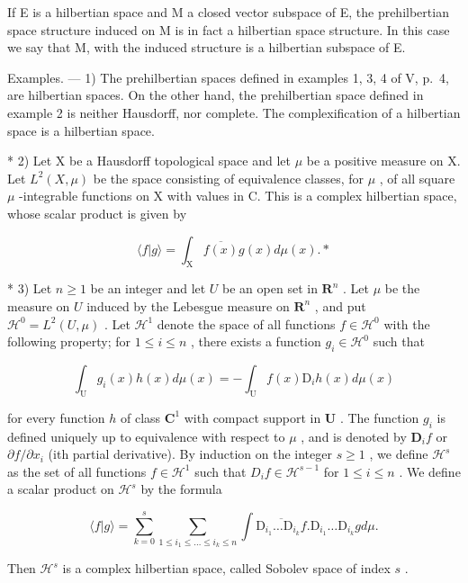 If E is a hilbertian space and M a closed vector subspace of E, the prehilbertian space structure induced on M is in fact a hilbertian space structure. In this case we say that M, with the induced structure is a hilbertian subspace of E.

Examples. --- 1) The prehilbertian spaces defined in examples 1, 3, 4 of V, p.~4, are hilbertian spaces. On the other hand, the prehilbertian space defined in example 2 is neither Hausdorff, nor complete. The complexification of a hilbertian space is a hilbertian space.

* 2) Let X be a Hausdorff topological space and let \(\mu\) be a positive measure on X. Let \(L^2(X, \mu)\) be the space consisting of equivalence classes, for \(\mu\) , of all square \(\mu\) -integrable functions on X with values in C. This is a complex hilbertian space, whose scalar product is given by

\[
\langle f | g \rangle = \int_ {\mathrm{X}} \overline {{{f (x)}}} g (x) d \mu (x). *
\]

* 3) Let \(n \geqslant 1\) be an integer and let \(U\) be an open set in \(\mathbf{R}^n\) . Let \(\mu\) be the measure on \(U\) induced by the Lebesgue measure on \(\mathbf{R}^n\) , and put \(\mathcal{H}^0 = L^2(U, \mu)\) . Let \(\mathcal{H}^1\) denote the space of all functions \(f \in \mathcal{H}^0\) with the following property; for \(1 \leqslant i \leqslant n\) , there exists a function \(g_i \in \mathcal{H}^0\) such that

\[
\int_ {\mathrm{U}} g _ {i} (x) h (x) d \mu (x) = - \int_ {\mathrm{U}} f (x) \mathrm{D} _ {i} h (x) d \mu (x)
\]

for every function \(h\) of class \(\mathbf{C}^1\) with compact support in \(\mathbf{U}\) . The function \(g_i\) is defined uniquely up to equivalence with respect to \(\mu\) , and is denoted by \(\mathbf{D}_i f\) or \(\partial f / \partial x_i\) (ith partial derivative). By induction on the integer \(s \geqslant 1\) , we define \(\mathcal{H}^s\) as the set of all functions \(f \in \mathcal{H}^1\) such that \(D_i f \in \mathcal{H}^{s-1}\) for \(1 \leqslant i \leqslant n\) . We define a scalar product on \(\mathcal{H}^s\) by the formula

\[
\langle f | g \rangle = \sum_ {k = 0} ^ {s} \sum_ {1 \leqslant i _ {1} \leqslant \dots \leqslant i _ {k} \leqslant n} \int \overline {{{{\mathrm{D} _ {i _ {1}} \dots \mathrm{D} _ {i _ {k}} f}}}}. \mathrm{D} _ {i _ {1}} \dots \mathrm{D} _ {i _ {k}} g d \mu .
\]

Then \(\mathcal{H}^s\) is a complex hilbertian space, called Sobolev space of index \(s\) .

